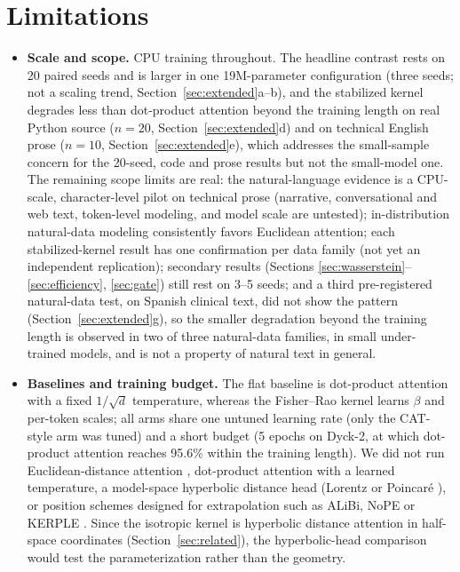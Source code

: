 \documentclass[11pt]{article}
\begin{document}
\section{Limitations}\label{sec:limitations}

\begin{itemize}
\item \textbf{Scale and scope.} CPU training throughout. The headline contrast rests on 20 paired seeds and is larger in one 19M-parameter configuration (three seeds; not a scaling trend, Section~\ref{sec:extended}a--b), and the stabilized kernel degrades less than dot-product attention beyond the training length on real Python source ($n=20$, Section~\ref{sec:extended}d) and on technical English prose ($n=10$, Section~\ref{sec:extended}e), which addresses the small-sample concern for the 20-seed, code and prose results but not the small-model one. The remaining scope limits are real: the natural-language evidence is a CPU-scale, character-level pilot on technical prose (narrative, conversational and web text, token-level modeling, and model scale are untested); in-distribution natural-data modeling consistently favors Euclidean attention; each stabilized-kernel result has one confirmation per data family (not yet an independent replication); secondary results (Sections \ref{sec:wasserstein}--\ref{sec:efficiency}, \ref{sec:gate}) still rest on 3--5 seeds; and a third pre-registered natural-data test, on Spanish clinical text, did not show the pattern (Section~\ref{sec:extended}g), so the smaller degradation beyond the training length is observed in two of three natural-data families, in small under-trained models, and is not a property of natural text in general.
\item \textbf{Baselines and training budget.} The flat baseline is dot-product attention with a fixed $1/\sqrt{d}$ temperature, whereas the Fisher--Rao kernel learns $\beta$ and per-token scales; all arms share one untuned learning rate (only the CAT-style arm was tuned) and a short budget (5 epochs on Dyck-2, at which dot-product attention reaches 95.6\% within the training length). We did not run Euclidean-distance attention \cite{kim2021lipschitz}, dot-product attention with a learned temperature, a model-space hyperbolic distance head (Lorentz or Poincar\'e \cite{gulcehre2019,chen2022fully}), or position schemes designed for extrapolation such as ALiBi, NoPE or KERPLE \cite{press2022alibi,kazemnejad2023nope,chi2022kerple}. Since the isotropic kernel is hyperbolic distance attention in half-space coordinates (Section~\ref{sec:related}), the hyperbolic-head comparison would test the parameterization rather than the geometry.

\end{itemize}
\end{document}
